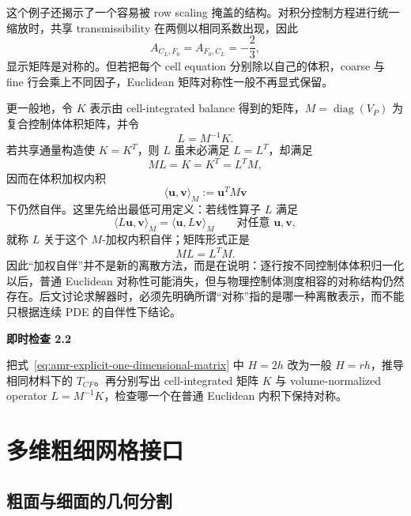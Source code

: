 这个例子还揭示了一个容易被 row scaling 掩盖的结构。对积分控制方程进行统一缩放时，共享 transmissibility 在两侧以相同系数出现，因此
\begin{equation}
A_{C_L,F_0}=A_{F_0,C_L}=-\frac23,
\end{equation}
显示矩阵是对称的。但若把每个 cell equation 分别除以自己的体积，coarse 与 fine 行会乘上不同因子，Euclidean 矩阵对称性一般不再显式保留。

更一般地，令 $K$ 表示由 cell-integrated balance 得到的矩阵，$M=\operatorname{diag}(V_P)$ 为复合控制体体积矩阵，并令
\begin{equation}
L=M^{-1}K.
\label{eq:amr-volume-normalized-operator}
\end{equation}
若共享通量构造使 $K=K^T$，则 $L$ 虽未必满足 $L=L^T$，却满足
\begin{equation}
ML=K=K^T=L^TM,
\end{equation}
因而在体积加权内积
\begin{equation}
\boxed{
\langle \bm u,\bm v\rangle_M
:=\bm u^TM\bm v
}
\label{eq:amr-volume-weighted-inner-product}
\end{equation}
下仍然自伴。这里先给出最低可用定义：若线性算子 $L$ 满足
\begin{equation}
\langle L\bm u,\bm v\rangle_M
=
\langle \bm u,L\bm v\rangle_M
\qquad
\text{对任意 }\bm u,\bm v,
\end{equation}
就称 $L$ 关于这个 $M$-加权内积自伴；矩阵形式正是
\begin{equation}
ML=L^TM.
\end{equation}
因此“加权自伴”并不是新的离散方法，而是在说明：逐行按不同控制体体积归一化以后，普通 Euclidean 对称性可能消失，但与物理控制体测度相容的对称结构仍然存在。后文讨论求解器时，必须先明确所谓“对称”指的是哪一种离散表示，而不能只根据连续 PDE 的自伴性下结论。

\begin{checkpointbox}
\textbf{即时检查 2.2}

把式~\eqref{eq:amr-explicit-one-dimensional-matrix} 中 $H=2h$ 改为一般 $H=rh$，推导相同材料下的 $T_{CF}$。再分别写出 cell-integrated 矩阵 $K$ 与 volume-normalized operator $L=M^{-1}K$，检查哪一个在普通 Euclidean 内积下保持对称。
\end{checkpointbox}

\section{多维粗细网格接口}
\label{sec:amr-multid-interface}

\subsection{粗面与细面的几何分割}

